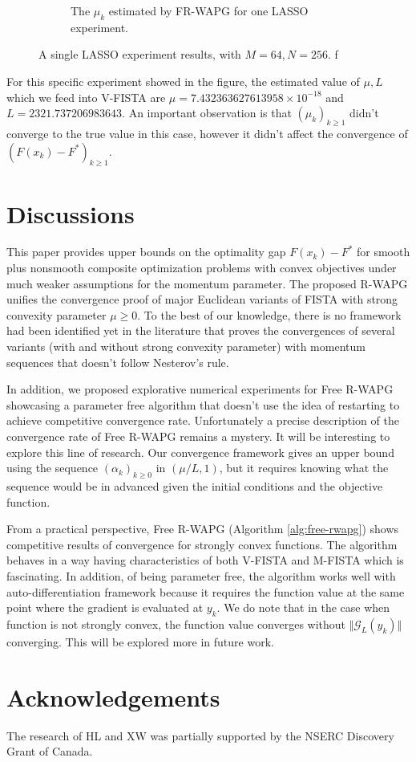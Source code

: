 \documentclass[12pt]{article}
\begin{document}
\begin{figure}[H]
\begin{subfigure}[b]{0.47\textwidth}
                    \caption{The $\mu_k$ estimated by FR-WAPG for one LASSO experiment. }
                \end{subfigure}
                \caption{A single LASSO experiment results, with $M = 64, N=256$. f}
                \label{fig:single-lass-mu-estimates}
            \end{figure}
            For this specific experiment showed in the figure, the estimated value of $\mu, L$ which we feed into V-FISTA are $\mu = 7.432363627613958\times 10^{-18}$ and $L = 2321.737206983643$.
            An important observation is that $(\mu_k)_{k\geq 1}$ didn't converge to the true value in this case, however it didn't affect the convergence of $(F(x_k) - F^*)_{k\geq 1}$.

\section{Discussions}\label{s:discussion}
    This paper provides upper bounds on the optimality gap $F(x_k) - F^*$ for smooth plus nonsmooth composite optimization problems with convex objectives under much weaker assumptions for the momentum parameter.
    The proposed R-WAPG unifies the convergence proof of major Euclidean variants of FISTA with strong convexity parameter $\mu \ge 0$.
    To the best of our knowledge, there is no framework had been identified yet in the literature that proves the convergences of several variants (with and without strong convexity parameter) with momentum sequences that doesn't follow Nesterov's rule.
    \par
    In addition, we proposed explorative numerical experiments for Free R-WAPG showcasing a parameter free algorithm that doesn't use the idea of restarting to achieve competitive convergence rate.
    Unfortunately a precise description of the convergence rate of Free R-WAPG remains a mystery.
    It will be interesting to explore this line of research.
    Our convergence framework gives an upper bound using the sequence $(\alpha_k)_{k \ge 0}$ in $(\mu/L, 1)$, but it requires knowing what the sequence would be in advanced given the initial conditions and the objective function.
    \par
    From a practical perspective, Free R-WAPG (Algorithm \ref{alg:free-rwapg}) shows competitive results of convergence for strongly convex functions.
    The algorithm behaves in a way having characteristics of both V-FISTA and M-FISTA which is fascinating.
    In addition, of being parameter free, the algorithm works well with auto-differentiation framework because it requires the function value at the same point where the gradient is evaluated at $y_k$.
    We do note that in the case when function is not strongly convex, the function value converges without $\Vert \mathcal G_L(y_k)\Vert$ converging.
    This will be explored more in future work.


\section*{Acknowledgements}
The research of HL and XW was partially supported by
the NSERC Discovery Grant of Canada.






\appendix
\end{document}
